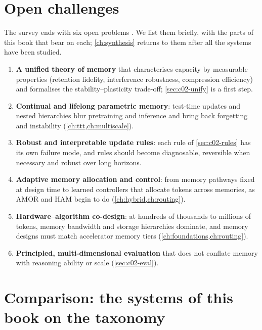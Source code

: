 \section{Open challenges}\label{sec:c02-open}

The survey ends with six open problems \citep[\S VI]{zhoubian2026memory}. We list them briefly, with
the parts of this book that bear on each; \cref{ch:synthesis} returns to them after all the systems
have been studied.
\begin{enumerate}[itemsep=0pt]
  \item \textbf{A unified theory of memory} that characterises capacity by measurable properties
        (retention fidelity, interference robustness, compression efficiency) and formalises the
        stability--plasticity trade-off; \cref{sec:c02-unify} is a first step.
  \item \textbf{Continual and lifelong parametric memory}: test-time updates and nested hierarchies
        blur pretraining and inference and bring back forgetting and instability
        (\cref{ch:ttt,ch:multiscale}).
  \item \textbf{Robust and interpretable update rules}: each rule of \cref{sec:c02-rules} has its own
        failure mode, and rules should become diagnosable, reversible when necessary and robust over
        long horizons.
  \item \textbf{Adaptive memory allocation and control}: from memory pathways fixed at design time to
        learned controllers that allocate tokens across memories, as AMOR and HAM begin to do
        (\cref{ch:hybrid,ch:routing}).
  \item \textbf{Hardware--algorithm co-design}: at hundreds of thousands to millions of tokens, memory
        bandwidth and storage hierarchies dominate, and memory designs must match accelerator memory
        tiers (\cref{ch:foundations,ch:routing}).
  \item \textbf{Principled, multi-dimensional evaluation} that does not conflate memory with reasoning
        ability or scale (\cref{sec:c02-eval}).
\end{enumerate}

\section{Comparison: the systems of this book on the taxonomy}\label{sec:c02-master}

